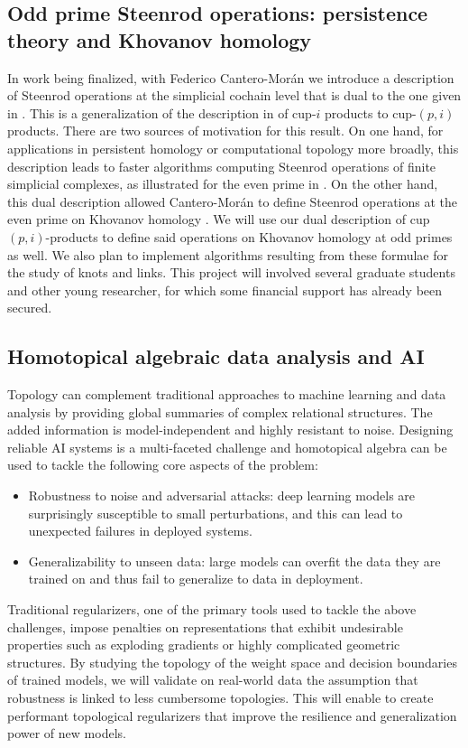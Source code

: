 \subsection{Odd prime Steenrod operations: persistence theory and Khovanov homology} \label{ss:odd prime steenrod operations}

In work being finalized, with Federico Cantero-Mor\'{a}n we introduce a description of Steenrod operations at the simplicial cochain level that is dual to the one given in \cite{medina2021maysteenrod}.
This is a generalization of the description in \cite{medina2021newformulas} of cup-$i$ products to cup-$(p,i)$ products.
There are two sources of motivation for this result.
On one hand, for applications in persistent homology or computational topology more broadly, this description leads to faster algorithms computing Steenrod operations of finite simplicial complexes, as illustrated for the even prime in \cite{medina2021newformulas}.
On the other hand, this dual description allowed Cantero-Mor\'an to define Steenrod operations at the even prime on Khovanov homology \cite{cantero-moran2020khovanov}.
We will use our dual description of cup $(p,i)$-products to define said operations on Khovanov homology at odd primes as well.
We also plan to implement algorithms resulting from these formulae for the study of knots and links.
This project will involved several graduate students and other young researcher, for which some financial support has already been secured.

\subsection{Homotopical algebraic data analysis and AI} \label{ss:ai}

Topology can complement traditional approaches to machine learning and data analysis by providing global summaries of complex relational structures.
The added information is model-independent and highly resistant to noise.
Designing reliable AI systems is a multi-faceted challenge and homotopical algebra can be used to tackle the following core aspects of the problem:

\begin{itemize}
	\item Robustness to noise and adversarial attacks: deep learning models are surprisingly susceptible to small perturbations, and this can lead to unexpected failures in deployed systems.
	\item Generalizability to unseen data: large models can overfit the data they are trained on and thus fail to generalize to data in deployment.
\end{itemize}
Traditional regularizers, one of the primary tools used to tackle the above challenges, impose penalties on representations that exhibit undesirable properties such as exploding gradients or highly complicated geometric structures.
By studying the topology of the weight space and decision boundaries of trained models, we will validate on real-world data the assumption that robustness is linked to less cumbersome topologies.
This will enable to create performant topological regularizers that improve the resilience and generalization power of new models.

